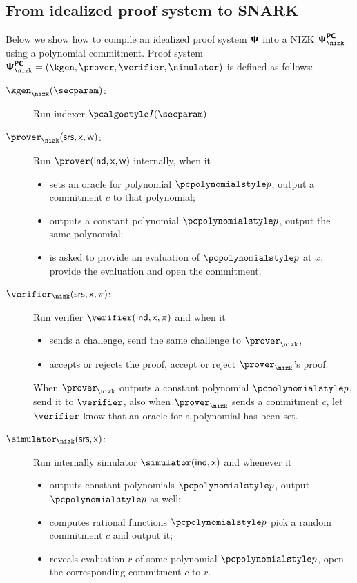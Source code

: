 \documentclass[runningheads,11pt]{llncs}
\begin{document}
\subsection{From idealized proof system to SNARK}
Below we show how to compile an idealized proof system $\bm{\mathsf{\Psi}}$ into a NIZK $\PSc$ using
a polynomial commitment. Proof system
$\PSc = (\kgen, \prover, \verifier, \simulator)$ is defined as follows:
\begin{description}
\item[$\kgenc (\secparam)$:] Run indexer $\indexer (\secparam)$ 
\item[$\proverc (\srs, \inp, \wit)$:] Run $\prover (\ind, \inp, \wit)$ internally, when it
  \begin{itemize}
  \item  sets an oracle for polynomial $\p{p}$, output a commitment $c$ to
    that polynomial;
  \item  outputs a constant polynomial $\p{p}$, output the same polynomial;
  \item  is asked to provide an evaluation of $\p{p}$ at $x$, provide the
    evaluation and open the commitment.
  \end{itemize}
\item[$\verifierc (\srs, \inp, \zkproof)$:] Run verifier
  $\verifier (\ind, \inp, \zkproof)$ and when it 
  \begin{itemize}
  \item sends a challenge, send the same challenge to $\proverc$,
  \item accepts or rejects the proof, accept or reject $\proverc$'s proof.
  \end{itemize}
  When $\proverc$ outputs a constant polynomial $\p{p}$, send it to $\verifier$, also
  when $\proverc$ sends a commitment $c$, let $\verifier$ know that an oracle for a
  polynomial has been set.
\item[$\simulatorc (\srs, \inp)$:] Run internally simulator $\simulator (\ind, \inp)$
  and whenever it
  \begin{itemize}
  \item outputs constant polynomials $\p{p}$, output $\p{p}$ as well;
  \item computes rational functions $\p{p}$ pick a random commitment $c$ and output
    it;
  \item reveals evaluation $r$ of some polynomial $\p{p}$, open the corresponding
    commitment $c$ to $r$.
  \end{itemize}
\end{description}
\end{document}
